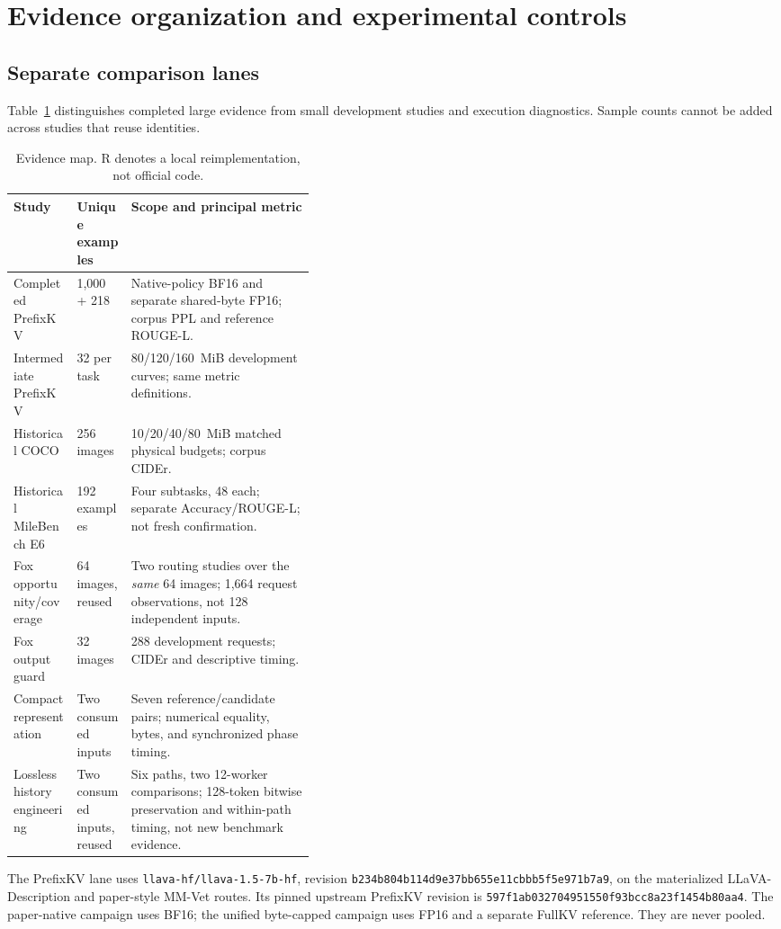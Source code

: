 \documentclass[10pt,letterpaper]{article}
\begin{document}
\section{Evidence organization and experimental controls}
\label{sec:setup}
\subsection{Separate comparison lanes}
Table~\ref{tab:evidence} distinguishes completed large evidence from small
development studies and execution diagnostics. Sample counts cannot be
added across studies that reuse identities.

\begin{table}[htbp]
\centering\small
\caption{Evidence map. R denotes a local reimplementation, not official code.}
\label{tab:evidence}
\begin{tabularx}{\linewidth}{p{0.21\linewidth}p{0.18\linewidth}X}
\toprule
Study & Unique examples & Scope and principal metric\\\midrule
Completed PrefixKV & 1,000 + 218 & Native-policy BF16 and separate shared-byte FP16; corpus PPL and reference ROUGE-L.\\
Intermediate PrefixKV & 32 per task & 80/120/160~MiB development curves; same metric definitions.\\
Historical COCO & 256 images & 10/20/40/80~MiB matched physical budgets; corpus CIDEr.\\
Historical MileBench E6 & 192 examples & Four subtasks, 48 each; separate Accuracy/ROUGE-L; not fresh confirmation.\\
Fox opportunity/coverage & 64 images, reused & Two routing studies over the \emph{same} 64 images; 1,664 request observations, not 128 independent inputs.\\
Fox output guard & 32 images & 288 development requests; CIDEr and descriptive timing.\\
Compact representation & Two consumed inputs & Seven reference/candidate pairs; numerical equality, bytes, and synchronized phase timing.\\
Lossless history engineering & Two consumed inputs, reused & Six paths, two 12-worker comparisons; 128-token bitwise preservation and within-path timing, not new benchmark evidence.\\
\bottomrule
\end{tabularx}
\end{table}

The PrefixKV lane uses \nolinkurl{llava-hf/llava-1.5-7b-hf}, revision
\nolinkurl{b234b804b114d9e37bb655e11cbbb5f5e971b7a9}, on the materialized
LLaVA-Description and paper-style MM-Vet routes. Its pinned upstream
PrefixKV revision is \nolinkurl{597f1ab032704951550f93bcc8a23f1454b80aa4}.
The paper-native campaign uses BF16; the unified byte-capped campaign uses
FP16 and a separate FullKV reference. They are never pooled.
\end{document}
